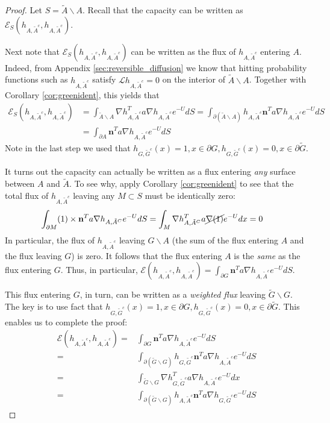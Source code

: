 \documentclass[english, aip, jcp, priprint, graphicx,floatfix]{revtex4-1}
\theoremstyle{plain}
\theoremstyle{definition}
\theoremstyle{plain}
\begin{document}
\begin{proof}
Let $S = \tilde A \backslash A$.  Recall that the capacity can be written as $\mathscr{E}_S(h_{A,\tilde A^c},h_{A,\tilde A^c})$.

Next note that $\mathscr{E}_S(h_{A,\tilde A^c},h_{A,\tilde A^c}) $ can be written as the flux of $h_{A,\tilde A^c}$ entering $A$.  Indeed, from Appendix \ref{sec:reversible_diffusion} we know that hitting probability functions such as $h_{A,\tilde A^c}$ satisfy $\mathcal Lh_{A,\tilde A^c}=0$ on the interior of $\tilde A \backslash A$.  Together with Corollary \ref{cor:greenident}, this yields that 
\begin{align*}
\mathscr{E}_S(h_{A,\tilde A^c},h_{A,\tilde A^c}) 
    &= \int_{\tilde A \backslash A}  \nabla h_{A, \tilde{A}^c}^T a  \nabla h_{A, \tilde{A}^c} e^{- U } dS 
    = \int_{\partial (\tilde A \backslash A)}  h_{A, \tilde{A}^c} \textbf{n}^T a  \nabla h_{A, \tilde{A}^c} e^{- U } dS \\
    &= \int_{\partial A}  \textbf{n}^T a  \nabla h_{A, \tilde{A}^c} e^{- U } dS
\end{align*}
Note in the last step we used that $h_{G,\tilde G^c}(x)=1,x\in \partial G,h_{G,\tilde G^c}(x)=0,x\in \partial \tilde G$.  

It turns out the capacity can actually be written as a flux entering \emph{any} surface between $A$ and $\tilde A$.  To see why, apply Corollary \ref{cor:greenident} to see that the total flux of $h_{A,\tilde A^c}$ leaving any $M\subset S$ must be identically zero:
\begin{align*}
\int_{\partial M} (1) \times \textbf{n}^T a  \nabla h_{A,\tilde A^C} e^{- U } dS
    &= \int_{M} \nabla h_{A,\tilde A^C}^T  a  \cancel{\nabla (1)} e^{- U } dx=0
\end{align*}
In particular, the flux of $h_{A,\tilde A^c}$ leaving $G \backslash A$ (the sum of the flux entering $A$ and the flux leaving $G$) is zero.  It follows that the flux entering $A$ is the \emph{same} as the flux entering $G$.  Thus, in particular, $\mathscr{E}(h_{A,\tilde A^c},h_{A,\tilde A^c}) = \int_{\partial G}  \textbf{n}^T a  \nabla h_{A, \tilde{A}^c} e^{- U } dS$.  

This flux entering $G$, in turn, can be written as a \emph{weighted flux} leaving $\tilde G \backslash G$.  The key is to use fact that $h_{G,\tilde G^c}(x)=1,x\in \partial G,h_{G,\tilde G^c}(x)=0,x\in \partial \tilde G$.  This enables us to complete the proof:
\begin{align*}
\mathscr{E}(h_{A,\tilde A^c},h_{A,\tilde A^c})
    =&\int_{\partial G}  \textbf{n}^T a  \nabla h_{A, \tilde{A}^c} e^{- U } dS\\
    =& \int_{\partial (\tilde G \backslash G)}  h_{G, \tilde{G}^c}    \textbf{n}^T a  \nabla h_{A, \tilde{A}^c} e^{- U } dS\\
    =& \int_{\tilde G \backslash G}  \nabla h_{G, \tilde{G}^c}^T a  \nabla h_{A, \tilde{A}^c} e^{- U } dx\\
    =&\int_{\partial (\tilde G \backslash G)}  h_{A, \tilde{A}^c}    \textbf{n}^T a  \nabla h_{G, \tilde{G}^c} e^{- U } dS
\end{align*}
\end{proof}
\end{document}
